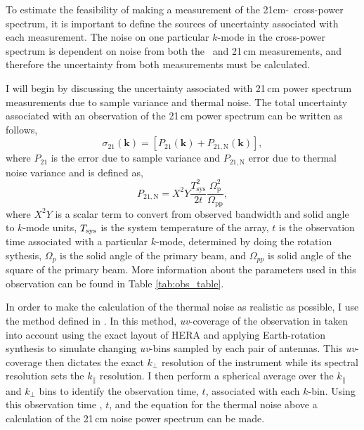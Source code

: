 To estimate the feasibility of making a measurement of the 21cm-\lya\ cross-power
spectrum, it is important to define the sources of uncertainty associated with each
measurement. The noise on one particular $k$-mode in the cross-power spectrum is
dependent on noise from both the \lya\ and 21\,cm measurements, and therefore the
uncertainty from both measurements must be calculated.

I will begin by discussing the uncertainty associated with 21\,cm power
spectrum measurements due to sample variance and thermal noise. The total uncertainty
associated with an observation of the 21\,cm power spectrum can be written as follows,
\begin{equation}
\sigma_{21} \left( \textbf{k} \right) = \left[ P_{21} \left( \textbf{k} \right) + P_{21, \textrm{N}} \left( \textbf{k} \right) \right],
\end{equation}
where $P_{21}$ is the error due to sample variance and $P_{21, \textrm{N}}$ error due to thermal noise variance and is defined as,
\begin{equation}
P_{21, \textrm{N}} = X^2 Y \frac{T^2_{\textrm{sys}}}{2 t} \frac{\Omega_{\textrm{p}}^2}{\Omega_{\textrm{pp}}},
\end{equation}
where $X^2Y$ is a scalar term to convert from observed bandwidth and solid angle to $k$-mode units, $T_{\rm sys}$ is the system temperature of the array, $t$ is the observation time associated with a particular $k$-mode, determined by doing the rotation sythesis, $\Omega_p$ is the solid angle of the primary beam, and $\Omega_{pp}$ is solid angle of the square of the primary beam. More information about the parameters used in this observation can be found in Table \ref{tab:obs_table}.

In order to make the calculation of the thermal noise as realistic as possible, I use the method defined in
\cite{2013AJ....145...65P}. In this method, \textit{uv}-coverage of the observation
in taken into account using the exact layout of HERA and applying Earth-rotation
synthesis to simulate changing \textit{uv}-bins sampled by each pair of antennas.
This \textit{uv}-coverage then dictates the exact $k_{\perp}$ resolution of the instrument
while its spectral resolution sets the $k_{\parallel}$ resolution. I then perform
a spherical average over the $k_{\parallel}$ and $k_{\perp}$ bins to identify
the observation time, $t$, associated with each $k$-bin. Using this observation time
, $t$, and the equation for the thermal noise above a calculation of the 21\,cm noise power
spectrum can be made.

